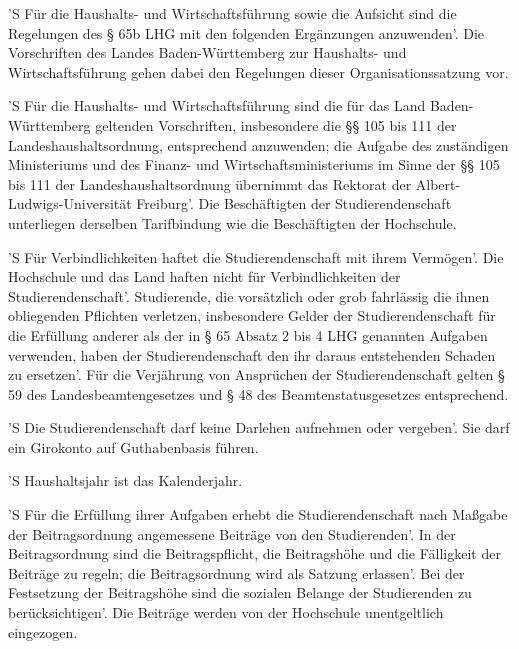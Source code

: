 \documentclass[fontsize=12pt,parskip=half]{scrartcl}
\begin{document}
\begin{contract}


  'S Für die Haushalts- und Wirtschaftsführung sowie die Aufsicht sind die
  Regelungen des § 65b LHG mit den folgenden Ergänzungen anzuwenden'. Die
  Vorschriften des Landes Baden-Württemberg zur Haushalts- und Wirtschaftsführung
  gehen dabei den Regelungen dieser Organisationssatzung vor.

  'S Für die Haushalts- und Wirtschaftsführung sind die für das Land
  Baden-Württemberg geltenden Vorschriften, insbesondere die §§ 105 bis 111 der
  Landeshaushaltsordnung, entsprechend anzuwenden; die Aufgabe des zuständigen
  Ministeriums und des Finanz- und Wirtschaftsministeriums im Sinne der §§ 105
  bis 111 der Landeshaushaltsordnung übernimmt das Rektorat der
  Albert-Ludwigs-Universität Freiburg'. Die Beschäftigten der Studierendenschaft
  unterliegen derselben Tarifbindung wie die Beschäftigten der Hochschule.

  'S Für Verbindlichkeiten haftet die Studierendenschaft mit ihrem Vermögen'. Die
  Hochschule und das Land haften nicht für Verbindlichkeiten der
  Studierendenschaft'. Studierende, die vorsätzlich oder grob fahrlässig die
  ihnen obliegenden Pflichten verletzen, insbesondere Gelder der
  Studierendenschaft für die Erfüllung anderer als der in § 65 Absatz 2 bis 4
  LHG genannten Aufgaben verwenden, haben der Studierendenschaft den ihr daraus
  entstehenden Schaden zu ersetzen'. Für die Verjährung von Ansprüchen der
  Studierendenschaft gelten § 59 des Landesbeamtengesetzes und § 48 des
  Beamtenstatusgesetzes entsprechend.

  'S Die Studierendenschaft darf keine Darlehen aufnehmen oder vergeben'. Sie darf
  ein Girokonto auf Guthabenbasis führen.



  'S Haushaltsjahr ist das Kalenderjahr.

  'S Für die Erfüllung ihrer Aufgaben erhebt die Studierendenschaft nach Maßgabe
  der Beitragsordnung angemessene Beiträge von den Studierenden'. In der
  Beitragsordnung sind die Beitragspflicht, die Beitragshöhe und die Fälligkeit
  der Beiträge zu regeln; die Beitragsordnung wird als Satzung erlassen'. Bei der
  Festsetzung der Beitragshöhe sind die sozialen Belange der Studierenden zu
  berücksichtigen'. Die Beiträge werden von der Hochschule unentgeltlich
  eingezogen.


\end{contract}
\end{document}
